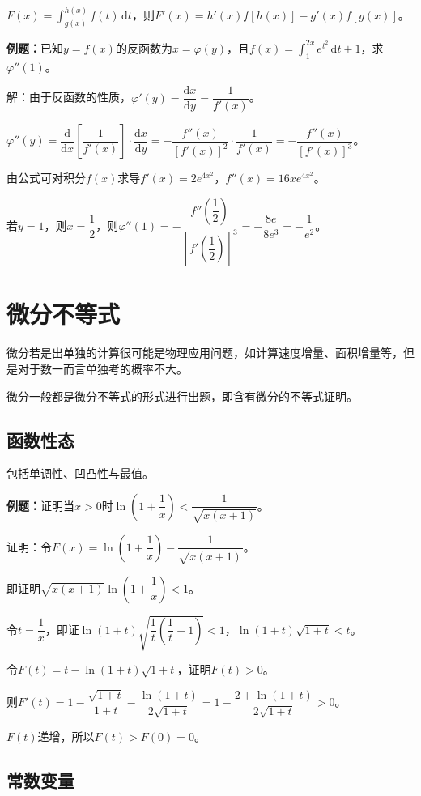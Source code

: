 \documentclass[UTF8, 12pt]{ctexart}
\begin{document}
$F(x)=\int_{g(x)}^{h(x)}f(t)\,\textrm{d}t$，则$F'(x)=h'(x)f[h(x)]-g'(x)f[g(x)]$。

\textbf{例题：}已知$y=f(x)$的反函数为$x=\varphi(y)$，且$f(x)=\int_1^{2x}e^{t^2}\,\textrm{d}t+1$，求$\varphi''(1)$。

解：由于反函数的性质，$\varphi'(y)=\dfrac{\textrm{d}x}{\textrm{d}y}=\dfrac{1}{f'(x)}$。

$\varphi''(y)=\dfrac{\textrm{d}}{\textrm{d}x}\left[\dfrac{1}{f'(x)}\right]\cdot\dfrac{\textrm{d}x}{\textrm{d}y}=-\dfrac{f''(x)}{[f'(x)]^2}\cdot\dfrac{1}{f'(x)}=-\dfrac{f''(x)}{[f'(x)]^3}$。

由公式可对积分$f(x)$求导$f'(x)=2e^{4x^2}$，$f''(x)=16xe^{4x^2}$。

若$y=1$，则$x=\dfrac{1}{2}$，则$\varphi''(1)=-\dfrac{f''\left(\dfrac{1}{2}\right)}{\left[f'\left(\dfrac{1}{2}\right)\right]^3}=-\dfrac{8e}{8e^3}=-\dfrac{1}{e^2}$。

\section{微分不等式}

微分若是出单独的计算很可能是物理应用问题，如计算速度增量、面积增量等，但是对于数一而言单独考的概率不大。

微分一般都是微分不等式的形式进行出题，即含有微分的不等式证明。

\subsection{函数性态}

包括单调性、凹凸性与最值。

\textbf{例题：}证明当$x>0$时$\ln\left(1+\dfrac{1}{x}\right)<\dfrac{1}{\sqrt{x(x+1)}}$。

证明：令$F(x)=\ln\left(1+\dfrac{1}{x}\right)-\dfrac{1}{\sqrt{x(x+1)}}$。

即证明$\sqrt{x(x+1)}\ln\left(1+\dfrac{1}{x}\right)<1$。

令$t=\dfrac{1}{x}$，即证$\ln(1+t)\sqrt{\dfrac{1}{t}\left(\dfrac{1}{t}+1\right)}<1$，$\ln(1+t)\sqrt{1+t}<t$。

令$F(t)=t-\ln(1+t)\sqrt{1+t}$，证明$F(t)>0$。\medskip

则$F'(t)=1-\dfrac{\sqrt{1+t}}{1+t}-\dfrac{\ln(1+t)}{2\sqrt{1+t}}=1-\dfrac{2+\ln(1+t)}{2\sqrt{1+t}}>0$。

$F(t)$递增，所以$F(t)>F(0)=0$。

\subsection{常数变量}
\end{document}
